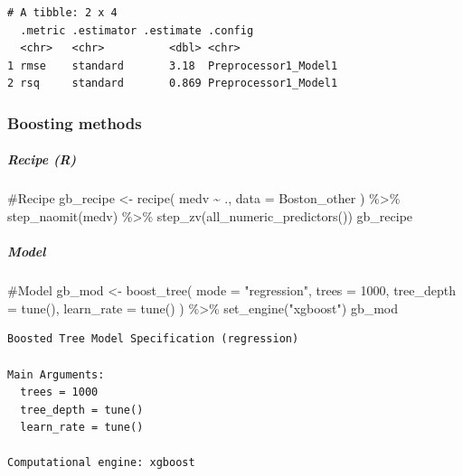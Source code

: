 \documentclass[
]{article}
\let\oldsubparagraph\subparagraph
\renewcommand{\subparagraph}[1]{\oldsubparagraph{#1}\mbox{}}
\newenvironment{Shaded}{\begin{snugshade}}{\end{snugshade}}
\newcommand{\AttributeTok}[1]{\textcolor[rgb]{0.40,0.45,0.13}{#1}}
\newcommand{\CommentTok}[1]{\textcolor[rgb]{0.37,0.37,0.37}{#1}}
\newcommand{\DecValTok}[1]{\textcolor[rgb]{0.68,0.00,0.00}{#1}}
\newcommand{\FunctionTok}[1]{\textcolor[rgb]{0.28,0.35,0.67}{#1}}
\newcommand{\NormalTok}[1]{\textcolor[rgb]{0.00,0.23,0.31}{#1}}
\newcommand{\OtherTok}[1]{\textcolor[rgb]{0.00,0.23,0.31}{#1}}
\newcommand{\SpecialCharTok}[1]{\textcolor[rgb]{0.37,0.37,0.37}{#1}}
\newcommand{\StringTok}[1]{\textcolor[rgb]{0.13,0.47,0.30}{#1}}
\begin{document}
\begin{verbatim}
# A tibble: 2 x 4
  .metric .estimator .estimate .config             
  <chr>   <chr>          <dbl> <chr>               
1 rmse    standard       3.18  Preprocessor1_Model1
2 rsq     standard       0.869 Preprocessor1_Model1
\end{verbatim}

\hypertarget{boosting-methods}{%
\subsubsection{Boosting methods}\label{boosting-methods}}

\hypertarget{recipe-r-1}{%
\subparagraph{Recipe (R)}\label{recipe-r-1}}

\begin{Shaded}
\begin{Highlighting}[]
\CommentTok{\#Recipe}
\NormalTok{gb\_recipe }\OtherTok{\textless{}{-}} 
  \FunctionTok{recipe}\NormalTok{(}
\NormalTok{    medv }\SpecialCharTok{\textasciitilde{}}\NormalTok{ ., }
    \AttributeTok{data =}\NormalTok{ Boston\_other}
\NormalTok{  ) }\SpecialCharTok{\%\textgreater{}\%}
  \FunctionTok{step\_naomit}\NormalTok{(medv) }\SpecialCharTok{\%\textgreater{}\%}
  \FunctionTok{step\_zv}\NormalTok{(}\FunctionTok{all\_numeric\_predictors}\NormalTok{())}
\NormalTok{gb\_recipe}
\end{Highlighting}
\end{Shaded}

\hypertarget{model-1}{%
\subparagraph{Model}\label{model-1}}

\begin{Shaded}
\begin{Highlighting}[]
\CommentTok{\#Model}
\NormalTok{gb\_mod }\OtherTok{\textless{}{-}} 
  \FunctionTok{boost\_tree}\NormalTok{(}
    \AttributeTok{mode =} \StringTok{"regression"}\NormalTok{,}
    \AttributeTok{trees =} \DecValTok{1000}\NormalTok{, }
    \AttributeTok{tree\_depth =} \FunctionTok{tune}\NormalTok{(),}
    \AttributeTok{learn\_rate =} \FunctionTok{tune}\NormalTok{()}
\NormalTok{  ) }\SpecialCharTok{\%\textgreater{}\%} 
  \FunctionTok{set\_engine}\NormalTok{(}\StringTok{"xgboost"}\NormalTok{)}
\NormalTok{gb\_mod}
\end{Highlighting}
\end{Shaded}

\begin{verbatim}
Boosted Tree Model Specification (regression)

Main Arguments:
  trees = 1000
  tree_depth = tune()
  learn_rate = tune()

Computational engine: xgboost 
\end{verbatim}
\end{document}
